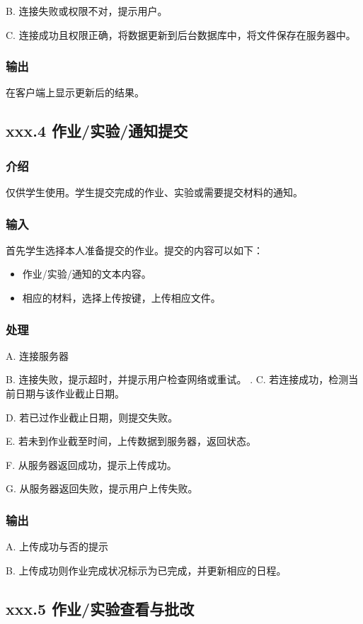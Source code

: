 	 B. 连接失败或权限不对，提示用户。

	 C. 连接成功且权限正确，将数据更新到后台数据库中，将文件保存在服务器中。

	 \subsubsection{输出}
	 在客户端上显示更新后的结果。
    \subsection{xxx.4 作业/实验/通知提交}
      \subsubsection{介绍}
	 仅供学生使用。学生提交完成的作业、实验或需要提交材料的通知。
	 \subsubsection{输入}
	 首先学生选择本人准备提交的作业。提交的内容可以如下：
	 \begin{itemize}
        \item 作业/实验/通知的文本内容。
        \item 相应的材料，选择上传按键，上传相应文件。
      \end{itemize}
	 \subsubsection{处理}
	 A. 连接服务器

	 B. 连接失败，提示超时，并提示用户检查网络或重试。
.
	 C. 若连接成功，检测当前日期与该作业截止日期。

	 D. 若已过作业截止日期，则提交失败。

	 E. 若未到作业截至时间，上传数据到服务器，返回状态。

	 F. 从服务器返回成功，提示上传成功。

	 G. 从服务器返回失败，提示用户上传失败。

	 \subsubsection{输出}
	 A. 上传成功与否的提示

	 B. 上传成功则作业完成状况标示为已完成，并更新相应的日程。

	\subsection{xxx.5 作业/实验查看与批改}
